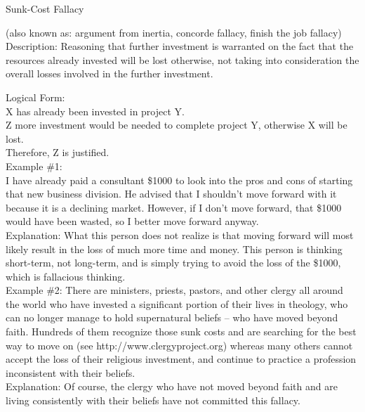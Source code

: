 \documentclass[a4paper,12pt,single,pdftex]{scrartcl}
\begin{document}
Sunk-Cost Fallacy
    
      (also known as: argument from inertia, concorde fallacy, finish the job fallacy)
    \\

  
    Description: Reasoning that further investment is warranted on the fact that the resources already invested will be lost otherwise, not taking into consideration the overall losses involved in the further investment.

    
      Logical Form:
    \\

    
      X has already been invested in project Y.
    \\

    
      Z more investment would be needed to complete project Y, otherwise X will be lost.
    \\

    
      Therefore, Z is justified.
    \\

    
      Example \#1:
    \\

    
      I have already paid a consultant \$1000 to look into the pros and cons of starting that new business division.  He advised that I shouldn’t move forward with it because it is a declining market.  However, if I don’t move forward, that \$1000 would have been wasted, so I better move forward anyway.
    \\

    
      Explanation: What this person does not realize is that moving forward will most likely result in the loss of much more time and money.  This person is thinking short-term, not long-term, and is simply trying to avoid the loss of the \$1000, which is fallacious thinking.
    \\

    
      Example \#2: There are ministers, priests, pastors, and other clergy all around the world who have invested a significant portion of their lives in theology, who can no longer manage to hold supernatural beliefs -- who have moved beyond faith.  Hundreds of them recognize those sunk costs and are searching for the best way to move on (see http://www.clergyproject.org) whereas many others cannot accept the loss of their religious investment, and continue to practice a profession inconsistent with their beliefs.
    \\

    
      Explanation: Of course, the clergy who have not moved beyond faith and are living consistently with their beliefs have not committed this fallacy.
    \\
\end{document}
